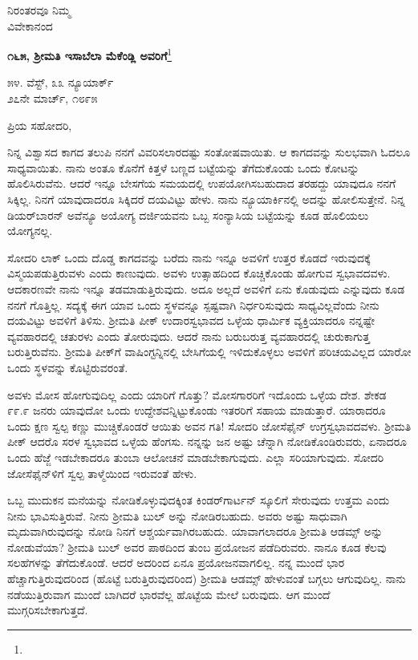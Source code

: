 {\flushright
ನಿರಂತರವೂ ನಿಮ್ಮ\\ವಿವೇಕಾನಂದ\par}

\begin{center}
\textbf{೧೬೫, ಶ‍್ರೀಮತಿ ಇಸಾಬೆಲಾ ಮೆಕೆಂಡ್ಲಿ ಅವರಿಗೆ}\footnote{}
\end{center}

\begin{flushright}
೫೪. ವೆಸ್ಟ್, ೩೩ ನ್ಯೂಯಾರ್ಕ್\\೨೭ನೇ ಮಾರ್ಚ್, ೧೮೯೫
\end{flushright}

\noindent
ಪ್ರಿಯ ಸಹೋದರಿ,

ನಿನ್ನ ವಿಶ್ವಾಸದ ಕಾಗದ ತಲುಪಿ ನನಗೆ ವಿವರಿಸಲಾರದಷ್ಟು ಸಂತೋಷವಾಯಿತು. ಆ ಕಾಗದವನ್ನು ಸುಲಭವಾಗಿ ಓದಲೂ ಸಾಧ್ಯವಾಯಿತು. ನಾನು ಅಂತೂ ಕೊನೆಗೆ ಕಿತ್ತಳೆ ಬಣ್ಣದ ಬಟ್ಟೆಯನ್ನು ತೆಗೆದುಕೊಂಡು ಒಂದು ಕೋಟನ್ನು ಹೊಲಿಸಿರುವೆನು. ಆದರೆ ಇನ್ನೂ ಬೇಸಗೆಯ ಸಮಯದಲ್ಲಿ ಉಪಯೋಗಿಸಬಹುದಾದ ತರಹದ್ದು ಯಾವುದೂ ನನಗೆ ಸಿಕ್ಕಿಲ್ಲ. ನಿನಗೆ ಯಾವುದಾದರೂ ಸಿಕ್ಕಿದರೆ ದಯವಿಟ್ಟು ಹೇಳು. ನಾನು ನ್ಯೂಯಾರ್ಕಿನಲ್ಲಿ ಅದನ್ನು ಹೋಲಿಸುತ್ತೇನೆ. ನಿನ್ನ ಡಿಯರ್‌ಬಾರನ್ ಅವೆನ್ಯೂ ಅಯೋಗ್ಯ ದರ್ಜಿಯವನು ಒಬ್ಬ ಸಂನ್ಯಾಸಿಯ ಬಟ್ಟೆಯನ್ನು ಕೂಡ ಹೊಲಿಯಲು ಯೋಗ್ಯನಲ್ಲ.

ಸೋದರಿ ಲಾಕ್ ಒಂದು ದೊಡ್ಡ ಕಾಗದವನ್ನು ಬರೆದು ನಾನು ಇನ್ನೂ ಅವಳಿಗೆ ಉತ್ತರ ಕೊಡದೆ ಇರುವುದಕ್ಕೆ ವಿಸ್ಮಯಪಡುತ್ತಿರುವಳು ಎಂದು ಕಾಣುವುದು. ಅವಳು ಉತ್ಸಾಹದಿಂದ ಕೊಚ್ಚಿಕೊಂಡು ಹೋಗುವ ಸ್ವಭಾವದವಳು. ಆದಕಾರಣವೇ ನಾನು ಇನ್ನೂ ತಡಮಾಡುತ್ತಿರುವುದು. ಅದೂ ಅಲ್ಲದೆ ಅವಳಿಗೆ ಏನು ಕೊಡುವುದು ಎನ್ನುವುದು ಕೂಡ ನನಗೆ ಗೊತ್ತಿಲ್ಲ. ಸದ್ಯಕ್ಕೆ ಈಗ ಯಾವ ಒಂದು ಸ್ಥಳವನ್ನೂ ಸ್ಪಷ್ಟವಾಗಿ ನಿರ್ಧರಿಸುವುದು ಸಾಧ್ಯವಿಲ್ಲವೆಂದು ನೀನು ದಯವಿಟ್ಟು ಅವಳಿಗೆ ತಿಳಿಸು. ಶ‍್ರೀಮತಿ ಪೀಕ್ ಉದಾರಸ್ವಭಾವದ ಒಳ್ಳೆಯ ಧಾರ್ಮಿಕ ವ್ಯಕ್ತಿಯಾದರೂ ನನ್ನಷ್ಟೇ ವ್ಯವಹಾರದಲ್ಲಿ ಚತುರಳು ಎಂದು ತೋರುವುದು. ಆದರೆ ನಾನು ಬರುಬರುತ್ತ ವ್ಯವಹಾರದಲ್ಲಿ ಚುರುಕಾಗುತ್ತ ಬರುತ್ತಿರುವೆನು. ಶ‍್ರೀಮತಿ ಪೀಕ್‌ಗೆ ವಾಷಿಂಗ್ಟನ್ನಿನಲ್ಲಿ ಬೇಸಿಗೆಯಲ್ಲಿ ಇಳಿದುಕೊಳ್ಳಲು ಅವಳಿಗೆ ಪರಿಚಯವಿಲ್ಲದ ಯಾರೋ ಒಂದು ಸ್ಥಳವನ್ನು ಕೊಟ್ಟಿರುವರಂತೆ.

ಅವಳು ಮೋಸ ಹೋಗುವುದಿಲ್ಲ ಎಂದು ಯಾರಿಗೆ ಗೊತ್ತು? ಮೋಸಗಾರರಿಗೆ ಇದೊಂದು ಒಳ್ಳೆಯ ದೇಶ. ಶೇಕಡ ೯೯.೯ ಜನರು ಯಾವುದೋ ಒಂದು ಉದ್ದೇಶವನ್ನಿಟ್ಟುಕೊಂಡು ಇತರರಿಗೆ ಸಹಾಯ ಮಾಡುತ್ತಾರೆ. ಯಾರಾದರೂ ಒಂದು ಕ್ಷಣ ಸ್ವಲ್ಪ ಕಣ್ಣು ಮುಚ್ಚಿಕೊಂಡರೆ ಆಯಿತು ಅವನ ಗತಿ! ಸೋದರಿ ಜೋಸೆಫೈನ್ ಉಗ್ರಸ್ವಭಾವದವಳು. ಶ‍್ರೀಮತಿ ಪೀಕ್ ಆದರೊ ಸರಳ ಸ್ವಭಾವದ ಒಳ್ಳೆಯ ಹೆಂಗಸು. ನನ್ನನ್ನು ಜನ ಅಷ್ಟು ಚೆನ್ನಾಗಿ ನೋಡಿಕೊಂಡಿರುವರು, ಏನಾದರೂ ಒಂದು ಹೆಜ್ಜೆ ಇಡಬೇಕಾದರೂ ತುಂಬಾ ಆಲೋಚನೆ ಮಾಡಬೇಕಾಗುವುದು. ಎಲ್ಲಾ ಸರಿಯಾಗುವುದು. ಸೋದರಿ ಜೋಸೆಫೈನ್‌ಳಿಗೆ ಸ್ವಲ್ಪ ತಾಳ್ಮೆಯಿಂದ ಇರುವಂತೆ ಹೇಳು.

ಒಬ್ಬ ಮುದುಕನ ಮನೆಯನ್ನು ನೋಡಿಕೊಳ್ಳುವುದಕ್ಕಿಂತ ಕಿಂಡರ್‌ಗಾರ್ಟನ್ ಸ್ಕೂಲಿಗೆ ಸೇರುವುದು ಉತ್ತಮ ಎಂದು ನೀನು ಭಾವಿಸುತ್ತಿರುವೆ. ನೀನು ಶ‍್ರೀಮತಿ ಬುಲ್ ಅನ್ನು ನೋಡಿರಬಹುದು. ಅವರು ಅಷ್ಟು ಸಾಧುವಾಗಿ ಮೃದುವಾಗಿರುವುದನ್ನು ನೋಡಿ ನಿನಗೆ ಆಶ್ಚರ್ಯವಾಗಿರಬಹುದು. ಯಾವಾಗಲಾದರೂ ಶ‍್ರೀಮತಿ ಆಡಮ್ಸ್ ಅನ್ನು ನೋಡುವೆಯಾ? ಶ‍್ರೀಮತಿ ಬುಲ್ ಅವರ ಪಾಠದಿಂದ ತುಂಬ ಪ್ರಯೋಜನ ಪಡೆದಿರುವರು. ನಾನೂ ಕೂಡ ಕೆಲವು ಸಲಹೆಗಳನ್ನು ತೆಗೆದುಕೊಂಡೆ. ಆದರೆ ಅದರಿಂದ ಏನೂ ಪ್ರಯೋಜನವಾಗಲಿಲ್ಲ. ನನ್ನ ಮುಂದೆ ಭಾರ ಹೆಚ್ಚಾಗುತ್ತಿರುವುದರಿಂದ (ಹೊಟ್ಟೆ ಬರುತ್ತಿರುವುದರಿಂದ) ಶ‍್ರೀಮತಿ ಆಡಮ್ಸ್ ಹೇಳುವಂತೆ ಬಗ್ಗಲು ಆಗುವುದಿಲ್ಲ. ನಾನು ನಡೆಯುತ್ತಿರುವಾಗ ಮುಂದೆ ಬಾಗಿದರೆ ಭಾರವೆಲ್ಲ ಹೊಟ್ಟೆಯ ಮೇಲೆ ಬರುವುದು. ಆಗ ಮುಂದೆ ಮುಗ್ಗರಿಸಬೇಕಾಗುತ್ತದೆ.


